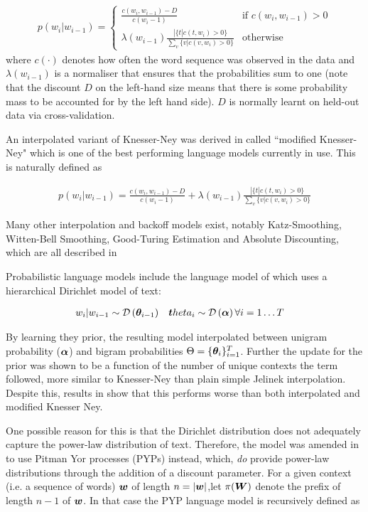 \begin{align}
p(w_i | w_{i-1}) = \left\{ \begin{array}{lr}
     \frac{c(w_i, w_{i-1}) - D}{c(w_i-1)} & \text{if } c(w_i, w_{i-1}) > 0 \\
     \lambda(w_{i-1})\frac{ | \{t | c(t, w_i) > 0\} }{\sum_v \{v | c(v, w_i) > 0\}} & \text{otherwise}
 \end{array}
\right.
\end{align}
where $c(\cdot)$ denotes how often the word sequence was observed in the data and $\lambda(w_{i-1})$ is a normaliser that ensures that the probabilities sum to one (note that the discount $D$ on the left-hand size means that there is some probability mass to be accounted for by the left hand side). $D$ is normally learnt on held-out data via cross-validation.

An interpolated variant of Knesser-Ney was derived in\cite{Goodman2001} called ``modified Knesser-Ney" which is one of the best performing language models currently in use. This is naturally defined as

\begin{align}
p(w_i | w_{i-1}) = \frac{c(w_i, w_{i-1}) - D}{c(w_i-1)} + \lambda(w_{i-1})\frac{ | \{t | c(t, w_i) > 0\} }{\sum_v \{v | c(v, w_i) > 0\}}
\end{align}

Many other interpolation and backoff models exist, notably Katz-Smoothing, Witten-Bell Smoothing, Good-Turing Estimation and Absolute Discounting, which are all described in \cite{Goodman2001}

Probabilistic language models include the language model of \cite{MacKay1995} which uses a hierarchical Dirichlet model of text:

\begin{align}
w_i|w_{i-1} & \sim \mathcal{D} \left( {\bm \theta_{i-1}} \right) & \bm theta_i & \sim \mathcal{D} \left( {\bm \alpha} \right) \forall i = 1\ldots T
\end{align}

By learning they prior, the resulting model interpolated between unigram probability ($\bm \alpha$) and bigram probabilities $\Theta = \{ \bm \theta_i \}_{i=1}^{T}$. Further the update for the prior was shown to be a function of the number of unique contexts the term followed, more similar to Knesser-Ney than plain simple Jelinek interpolation. Despite this, results in \cite{Teh} show that this performs worse than both interpolated and modified Knesser Ney.

One possible reason for this is that the Dirichlet distribution does not adequately capture the power-law distribution of text. Therefore, the model was amended in \cite{Teh} to use Pitman Yor processes (PYPs) instead, which, \emph{do} provide power-law distributions through the addition of a discount parameter. For a given context (i.e. a sequence of words) $\bm w$ of length $n = |\bm w|$,let $\pi(\bm W)$ denote the prefix of length $n-1$ of $\bm w$. In that case the PYP language model is recursively defined as

